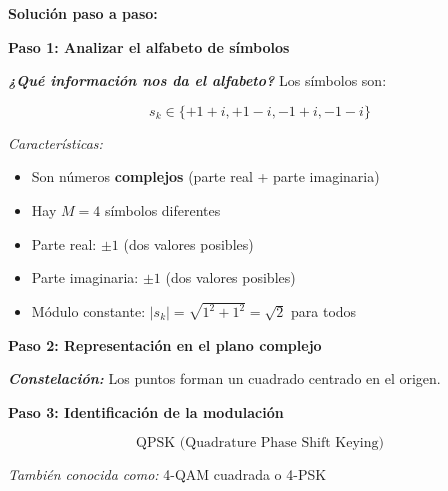 \documentclass[11pt,a4paper]{article}
\begin{document}
\vspace{0.3cm}
\textbf{Solución paso a paso:}

\textbf{Paso 1: Analizar el alfabeto de símbolos}

\textit{\textbf{¿Qué información nos da el alfabeto?}} Los símbolos son:

\[
s_k \in \{+1+i, +1-i, -1+i, -1-i\}
\]

\textit{Características:}
\begin{itemize}
    \item Son números \textbf{complejos} (parte real + parte imaginaria)
    \item Hay $M = 4$ símbolos diferentes
    \item Parte real: $\pm 1$ (dos valores posibles)
    \item Parte imaginaria: $\pm 1$ (dos valores posibles)
    \item Módulo constante: $|s_k| = \sqrt{1^2 + 1^2} = \sqrt{2}$ para todos
\end{itemize}

\textbf{Paso 2: Representación en el plano complejo}

\textit{\textbf{Constelación:}} Los puntos forman un cuadrado centrado en el origen.

\begin{center}
\end{center}

\textbf{Paso 3: Identificación de la modulación}

\[
\boxed{\text{QPSK (Quadrature Phase Shift Keying)}}
\]

\textit{También conocida como:} 4-QAM cuadrada o 4-PSK
\end{document}
